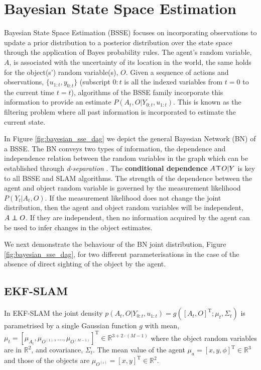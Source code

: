 \documentclass{frontiersSCNS} %
\newcommand\independent{\protect\mathpalette{\protect\independenT}{\perp}}\def\independenT#1#2{\mathrel{\rlap{$#1#2$}\mkern2mu{#1#2}}}
\newcommand{\dependent}{\rotatebox[origin=c]{180}{$\independent$}}
\begin{document}
\section{Bayesian State Space Estimation}\label{sec:BSSE}

Bayesian State Space Estimation (BSSE) focuses on incorporating observations to update a prior distribution to a posterior distribution 
over the state space through the application of Bayes probability rules. The agent's random variable, $A$, 
is associated with the uncertainty of its location in the world, the same holds for the object(s') random variable(s), $O$. 
Given a sequence of actions and observations, $\{u_{1:t},y_{0:t}\}$ (subscript $0:t$ is all the indexed variables from $t=0$ to the current time $t=t$), 
algorithms of the BSSE family incorporate this information to provide an estimate $P(A_t,O|Y_{0:t},u_{1:t})$. This is known as the 
filtering problem where all past information is incorporated to estimate the current state.  

In Figure \ref{fig:bayesian_sse_dag} we depict the general Bayesian Network (BN) of a BSSE. The BN conveys two types of
information, the dependence and independence relation between the random variables in the graph which can be established
through \textit{d-separation} \cite{BayesBall}. The \textbf{conditional dependence} $A \dependent O | Y$ is key to all BSSE and SLAM algorithms. 
The strength of the dependence between the agent and object random variable is governed by the measurement likelihood $P(Y_t|A_t,O)$. 
If the measurement likelihood does not change the joint distribution, then the agent and object random variables will be independent, $A \independent O$. 
If they are independent, then no information acquired by the agent can be used to infer changes in the object estimates.
    
We next demonstrate the behaviour of the BN joint distribution, Figure \ref{fig:bayesian_sse_dag}, for two different parameterisations 
in the case of the absence of direct sighting of the object by the agent.

\subsection{EKF-SLAM}\label{sec:EKF-SLAM}

In EKF-SLAM the joint density $p(A_{t},O|Y_{0:t},u_{1:t}) = g([A_t,O]^{\mathrm{T}};\mu_t,\Sigma_t)$ is parametrised by a single Gaussian 
function $g$ with mean, $\mu_t = \left[\mu_{A_{t}},\mu_{O^{(1)}},\dots,\mu_{O^{(M-1)}}\right]^{\mathrm{T}} \in \mathbb{R}^{3 + 2\cdot (M-1)}$  where the 
object random variables are in $\mathbb{R}^2$, and covariance, $\Sigma_t$. The mean value of the agent 
$\mu_a = [x,y,\phi]^{\mathrm{T}} \in \mathbb{R}^3$ and those of the objects are $\mu_{O^{(i)}} = [x,y]^{\mathrm{T}} \in \mathbb{R}^2$.
\end{document}
